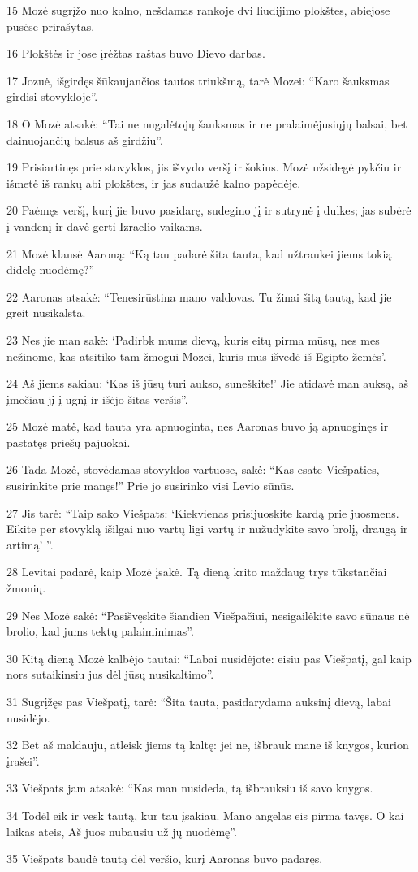\par 15 Mozė sugrįžo nuo kalno, nešdamas rankoje dvi liudijimo plokštes, abiejose pusėse prirašytas. 
\par 16 Plokštės ir jose įrėžtas raštas buvo Dievo darbas. 
\par 17 Jozuė, išgirdęs šūkaujančios tautos triukšmą, tarė Mozei: “Karo šauksmas girdisi stovykloje”. 
\par 18 O Mozė atsakė: “Tai ne nugalėtojų šauksmas ir ne pralaimėjusiųjų balsai, bet dainuojančių balsus aš girdžiu”. 
\par 19 Prisiartinęs prie stovyklos, jis išvydo veršį ir šokius. Mozė užsidegė pykčiu ir išmetė iš rankų abi plokštes, ir jas sudaužė kalno papėdėje. 
\par 20 Paėmęs veršį, kurį jie buvo pasidarę, sudegino jį ir sutrynė į dulkes; jas subėrė į vandenį ir davė gerti Izraelio vaikams. 
\par 21 Mozė klausė Aaroną: “Ką tau padarė šita tauta, kad užtraukei jiems tokią didelę nuodėmę?” 
\par 22 Aaronas atsakė: “Tenesirūstina mano valdovas. Tu žinai šitą tautą, kad jie greit nusikalsta. 
\par 23 Nes jie man sakė: ‘Padirbk mums dievą, kuris eitų pirma mūsų, nes mes nežinome, kas atsitiko tam žmogui Mozei, kuris mus išvedė iš Egipto žemės’. 
\par 24 Aš jiems sakiau: ‘Kas iš jūsų turi aukso, suneškite!’ Jie atidavė man auksą, aš įmečiau jį į ugnį ir išėjo šitas veršis”. 
\par 25 Mozė matė, kad tauta yra apnuoginta, nes Aaronas buvo ją apnuoginęs ir pastatęs priešų pajuokai. 
\par 26 Tada Mozė, stovėdamas stovyklos vartuose, sakė: “Kas esate Viešpaties, susirinkite prie manęs!” Prie jo susirinko visi Levio sūnūs. 
\par 27 Jis tarė: “Taip sako Viešpats: ‘Kiekvienas prisijuoskite kardą prie juosmens. Eikite per stovyklą išilgai nuo vartų ligi vartų ir nužudykite savo brolį, draugą ir artimą’ ”. 
\par 28 Levitai padarė, kaip Mozė įsakė. Tą dieną krito maždaug trys tūkstančiai žmonių. 
\par 29 Nes Mozė sakė: “Pasišvęskite šiandien Viešpačiui, nesigailėkite savo sūnaus nė brolio, kad jums tektų palaiminimas”. 
\par 30 Kitą dieną Mozė kalbėjo tautai: “Labai nusidėjote: eisiu pas Viešpatį, gal kaip nors sutaikinsiu jus dėl jūsų nusikaltimo”. 
\par 31 Sugrįžęs pas Viešpatį, tarė: “Šita tauta, pasidarydama auksinį dievą, labai nusidėjo. 
\par 32 Bet aš maldauju, atleisk jiems tą kaltę: jei ne, išbrauk mane iš knygos, kurion įrašei”. 
\par 33 Viešpats jam atsakė: “Kas man nusideda, tą išbrauksiu iš savo knygos. 
\par 34 Todėl eik ir vesk tautą, kur tau įsakiau. Mano angelas eis pirma tavęs. O kai laikas ateis, Aš juos nubausiu už jų nuodėmę”. 
\par 35 Viešpats baudė tautą dėl veršio, kurį Aaronas buvo padaręs.



